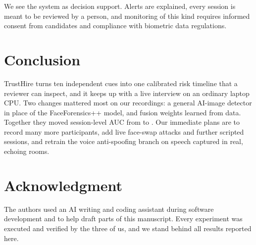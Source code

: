 \documentclass[conference]{IEEEtran}
\begin{document}
We see the system as decision support. Alerts are explained, every session is meant to be reviewed by a person, and
monitoring of this kind requires informed consent from candidates and compliance with biometric data regulations.

\section{Conclusion}

TrustHire turns ten independent cues into one calibrated risk timeline that a reviewer can inspect, and it keeps up
with a live interview on an ordinary laptop CPU. Two changes mattered most on our recordings: a general AI-image
detector in place of the FaceForensics++ model, and fusion weights learned from data. Together they moved
session-level AUC from \HandOldSessAUC{} to \LearnSessAUC{}. Our immediate plans are to record many more
participants, add live face-swap attacks and further scripted sessions, and retrain the voice anti-spoofing branch
on speech captured in real, echoing rooms.

\section*{Acknowledgment}

The authors used an AI writing and coding assistant during software development and to help draft parts of this
manuscript. Every experiment was executed and verified by the three of us, and we stand behind all results reported here.



\end{document}
